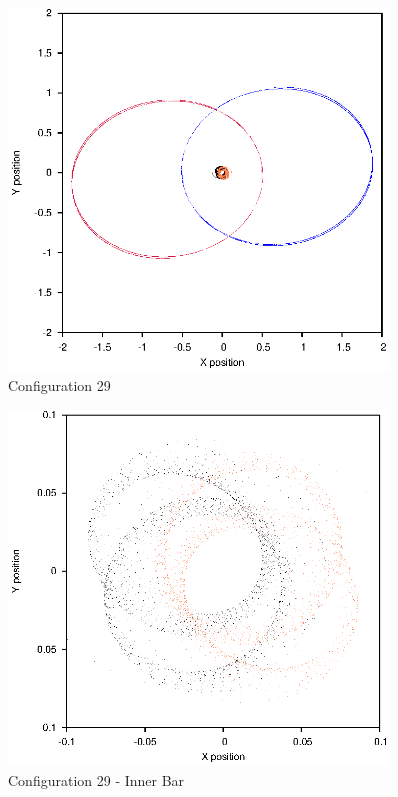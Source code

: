 \documentclass[a4paper,12pt]{article}
\begin{document}
\begin{figure}[H]
\centering
\includegraphics[width=0.9\textwidth]{./2017results/12-11-12-015/Orbit.eps}
\caption{Configuration 29}
\label{fig:config29}
\end{figure}
\begin{figure}[H]
\centering
\includegraphics[width=0.9\textwidth]{./2017results/12-11-12-015/Inner.eps}
\caption{Configuration 29 - Inner Bar}
\label{fig:config29i}
\end{figure}
\end{document}
